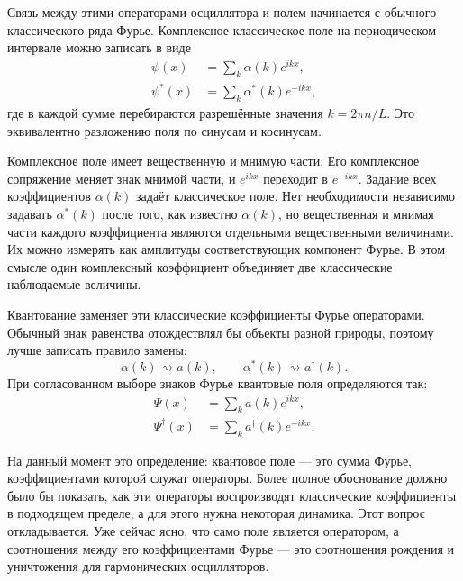 Связь между этими операторами осциллятора и полем начинается с обычного классического ряда Фурье. Комплексное классическое поле на периодическом интервале можно записать в виде
\begin{align}
\psi(x)&=\sum_k \alpha(k)e^{ikx},\\
\psi^*(x)&=\sum_k \alpha^*(k)e^{-ikx},
\end{align}
где в каждой сумме перебираются разрешённые значения \(k=2\pi n/L\). Это эквивалентно разложению поля по синусам и косинусам.

Комплексное поле имеет вещественную и мнимую части. Его комплексное сопряжение меняет знак мнимой части, и \(e^{ikx}\) переходит в \(e^{-ikx}\). Задание всех коэффициентов \(\alpha(k)\) задаёт классическое поле. Нет необходимости независимо задавать \(\alpha^*(k)\) после того, как известно \(\alpha(k)\), но вещественная и мнимая части каждого коэффициента являются отдельными вещественными величинами. Их можно измерять как амплитуды соответствующих компонент Фурье. В этом смысле один комплексный коэффициент объединяет две классические наблюдаемые величины.

Квантование заменяет эти классические коэффициенты Фурье операторами. Обычный знак равенства отождествлял бы объекты разной природы, поэтому лучше записать правило замены:
\begin{equation}
\alpha(k)\rightsquigarrow a(k),
\qquad
\alpha^*(k)\rightsquigarrow a^\dagger(k).
\end{equation}
При согласованном выборе знаков Фурье квантовые поля определяются так:
\begin{align}
\Psi(x)&=\sum_k a(k)e^{ikx},\\
\Psi^\dagger(x)&=\sum_k a^\dagger(k)e^{-ikx}.
\end{align}

На данный момент это определение: квантовое поле — это сумма Фурье, коэффициентами которой служат операторы. Более полное обоснование должно было бы показать, как эти операторы воспроизводят классические коэффициенты в подходящем пределе, а для этого нужна некоторая динамика. Этот вопрос откладывается. Уже сейчас ясно, что само поле является оператором, а соотношения между его коэффициентами Фурье — это соотношения рождения и уничтожения для гармонических осцилляторов.

